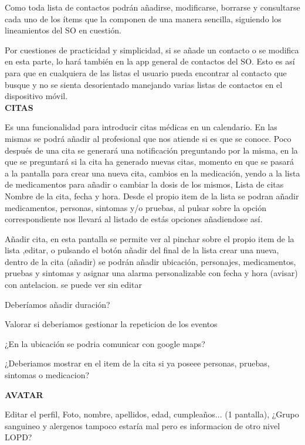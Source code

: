 \documentclass[../pfc.tex]{subfiles}
\begin{document}
	Como toda lista de contactos podrán añadirse, modificarse, borrarse y consultarse cada uno de los ítems que la componen de una manera sencilla, siguiendo los lineamientos del SO en cuestión.
	
	Por cuestiones de practicidad y simplicidad, si se añade un contacto o se modifica en esta parte, lo hará también en la app general de contactos del SO. Esto es así para que en cualquiera de las listas el usuario pueda encontrar al contacto que busque y no se sienta desorientado manejando varias listas de contactos en el dispositivo móvil. \\
	
	\textbf{CITAS}
	
	Es una funcionalidad para introducir citas médicas en un calendario. En las mismas se podrá añadir al profesional que nos atiende si es que se conoce. 
	Poco después de una cita se generará una notificación preguntando por la misma, en la que se preguntará si la cita ha generado nuevas citas, momento en que se pasará a la pantalla para crear una nueva cita, cambios en la medicación, yendo a la lista de medicamentos para añadir o cambiar la dosis de los mismos, 
	Lista de citas Nombre de la cita, fecha y hora.
	Desde el propio item de la lista se podran añadir medicamentos, personas, sintomas y/o pruebas, al pulsar sobre la opción correspondiente nos llevará al listado de estás opciones añadiendose así.
	
	Añadir cita, en esta pantalla se permite ver al pinchar sobre el propio item de la lista ,editar, o pulsando el botón añadir del final de la lista crear una nueva, 
	dentro de la cita (añadir) se podrán añadir ubicación, personajes, medicamentos, pruebas y sintomas y asignar una alarma personalizable con fecha y hora (avisar) con antelacion.
	se puede ver sin editar

	
	Deberíamos añadir duración?

	
	Valorar si deberiamos gestionar la repeticion de los eventos

	
	¿En la ubicación se podria comunicar con google maps?

	
	¿Deberiamos mostrar en el item de la cita si ya poseee personas, pruebas, sintomas o medicacion?







	\textbf{AVATAR}
	
	Editar el perfil, Foto, nombre, apellidos, edad, cumpleaños... (1 pantalla), ¿Grupo sanguineo y alergenos tampoco estaría mal pero es informacion de otro nivel LOPD?
	
\end{document}
